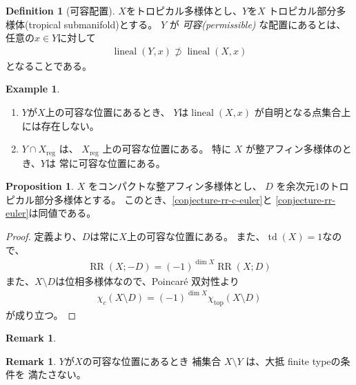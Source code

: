 \documentclass[a4paper,dvipdfmx,reqno,12pt]{amsart}
\theoremstyle{definition}
\newtheorem{definition}[theorem]{Definition}
\newtheorem{example}[theorem]{Example}
\newtheorem{proposition}[theorem]{Proposition}
\newtheorem{remark}[theorem]{Remark}
\newcommand{\opn}[1]{\operatorname{#1}}
\numberwithin{equation}{section}
\begin{document}
\begin{definition}[{可容配置}]
\label{definition-permissible-position}
$X$をトロピカル多様体とし、$Y$を$X$
トロピカル部分多様体(tropical submanifold)とする。
$Y$ が \emph{可容(permissible)} な配置にあるとは、
任意の$x\in Y$に対して
\begin{align}
     \opn{lineal}(Y,x)\not \supset \opn{lineal}(X,x)
\end{align}
となることである。
\end{definition}

\begin{example}
\begin{enumerate}
\item $Y$が$X$上の可容な位置にあるとき、
$Y$は$\opn{lineal}(X,x)$
が自明となる点集合上には存在しない。
\item $Y\cap X_{\mathrm{reg}}$ は、
$X_{\mathrm{reg}}$ 上の可容な位置にある。
特に $X$ が整アフィン多様体のとき、$Y$は
常に可容な位置にある。
\end{enumerate}

\end{example}

\begin{proposition}
$X$ をコンパクトな整アフィン多様体とし、
$D$ を余次元$1$のトロピカル部分多様体とする。
このとき、\cref{conjecture-rr-c-euler}と
\cref{conjecture-rr-euler}は同値である。
\end{proposition}
\begin{proof}
定義より、$D$は常に$X$上の可容な位置にある。
また、$\opn{td}(X)=1$なので、
\begin{align}
\opn{RR}(X;-D)=(-1)^{\dim X}\opn{RR}(X;D)
\end{align}
また、$X\setminus D$は位相多様体なので、Poincar\'e 双対性より
\begin{align}
\chi_c(X\setminus D)=(-1)^{\dim X}\chi_{\mathrm{top}}(X\setminus D)
\end{align}
が成り立つ。
\end{proof}

\begin{remark}
     
\end{remark}

\begin{remark}
$Y$が$X$の可容な位置にあるとき
補集合 $X\setminus Y$ は、大抵 finite typeの条件を
満たさない。
\end{remark}
\end{document}
